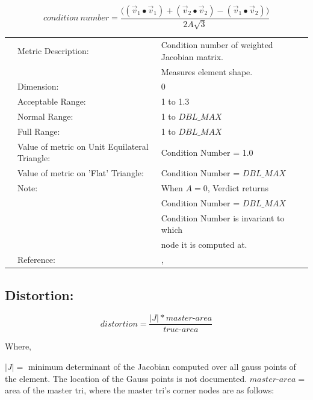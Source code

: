 \documentclass[12pt]{article}
\begin{document}
\begin{displaymath}
condition~number = \frac {\Big( (\vec v_1 \bullet \vec v_1) + 
                        (\vec v_2 \bullet \vec v_2) -  
                        (\vec v_1 \bullet \vec v_2) \Big)} 
                        { 2A \sqrt 3 }
\end{displaymath}

\begin{tabular}{lll}
& Metric Description:  & Condition number of weighted Jacobian matrix.         \\
&                      & Measures element shape.   \\
& Dimension:           & 0                      \\ 
& Acceptable Range:    & 1 to 1.3               \\ 
& Normal Range:        & 1 to $DBL\_MAX$        \\ 
& Full Range:          & 1 to $DBL\_MAX$        \\ 
& Value of metric on Unit Equilateral Triangle:       & Condition Number = 1.0 \\
& Value of metric on 'Flat' Triangle:  & Condition Number = $DBL\_MAX$  \\
& Note:                & When $A = 0$, Verdict returns  \\
&                      & Condition Number = $DBL\_MAX$  \\
&                      & Condition Number is invariant to which \\
&                      & node it is computed at. \\
& Reference:           & \cite{four}, \cite{five} \\
\end{tabular} 

\subsection*{Distortion:}

\begin{displaymath}
distortion = \frac{ |J|*master\textrm{-}area } { true\textrm{-}area }  
\end{displaymath}

\begin{flushleft} Where, \end{flushleft}
$|J| = $ minimum determinant of the Jacobian computed over all gauss points  \newline
of the element.  The location of the Gauss points is not documented. \newline 
$master\textrm{-}area =$ area of the master tri, where the master tri's corner nodes \newline
are as follows: \newline
\end{document}
